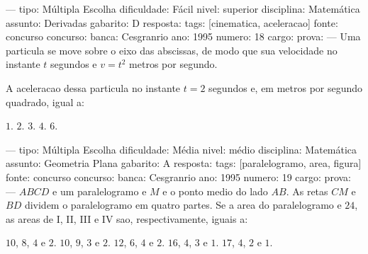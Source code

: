 ---
tipo: Múltipla Escolha
dificuldade: Fácil
nivel: superior
disciplina: Matemática
assunto: Derivadas
gabarito: D
resposta:
tags: [cinematica, aceleracao]
fonte: concurso
concurso:
banca: Cesgranrio
ano: 1995
numero: 18
cargo:
prova:
---
\question
Uma particula se move sobre o eixo das abscissas, de modo que sua velocidade no instante $t$ segundos e $v = t^2$ metros por segundo.

A aceleracao dessa particula no instante $t = 2$ segundos e, em metros por segundo quadrado, igual a:
\begin{choices}
\choice $1$.
\choice $2$.
\choice $3$.
\CorrectChoice $4$.
\choice $6$.
\end{choices}

---
tipo: Múltipla Escolha
dificuldade: Média
nivel: médio
disciplina: Matemática
assunto: Geometria Plana
gabarito: A
resposta:
tags: [paralelogramo, area, figura]
fonte: concurso
concurso:
banca: Cesgranrio
ano: 1995
numero: 19
cargo:
prova:
---
\question
$ABCD$ e um paralelogramo e $M$ e o ponto medio do lado $AB$. As retas $CM$ e $BD$ dividem o paralelogramo em quatro partes. Se a area do paralelogramo e $24$, as areas de I, II, III e IV sao, respectivamente, iguais a:
\begin{choices}
\CorrectChoice $10$, $8$, $4$ e $2$.
\choice $10$, $9$, $3$ e $2$.
\choice $12$, $6$, $4$ e $2$.
\choice $16$, $4$, $3$ e $1$.
\choice $17$, $4$, $2$ e $1$.
\end{choices}

